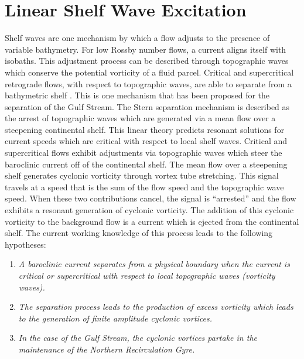 \documentclass[12pt]{workjournal}
\begin{document}
\chapter{Linear Shelf Wave Excitation} \label{chapter:shelfwaves}
Shelf waves are one mechanism by which a flow adjusts to the presence of variable bathymetry. For low Rossby number flows, a current aligns itself with isobaths. This adjustment process can be described through topographic waves which conserve the potential vorticity of a fluid parcel. Critical and supercritical retrograde flows, with respect to topographic waves, are able to separate from a bathymetric shelf \citep{Stern1998}. This is one mechanism that has been proposed for the separation of the Gulf Stream. The Stern separation mechanism is described as the arrest of topographic waves which are generated via a mean flow over a steepening continental shelf. This linear theory predicts resonant solutions for current speeds which are critical with respect to local shelf waves. Critical and supercritical flows exhibit adjustments via topographic waves which steer the baroclinic current off of the continental shelf. The mean flow over a steepening shelf generates cyclonic vorticity through vortex tube stretching. This signal travels at a speed that is the sum of the flow speed and the topographic wave speed. When these two contributions cancel, the signal is ``arrested'' and the flow exhibits a resonant generation of cyclonic vorticity. The addition of this cyclonic vorticity to the background flow is a current which is ejected from the continental shelf. The current working knowledge of this process leads to the following hypotheses:\\
\begin{center}
\begin{enumerate}
\item \textit{ A baroclinic current separates from a physical boundary when the current is critical or supercritical with respect to local topographic waves (vorticity waves).}
\item \textit{ The separation process leads to the production of excess vorticity which leads to the generation of finite amplitude cyclonic vortices.}
\item \textit{ In the case of the Gulf Stream, the cyclonic vortices partake in the maintenance of the Northern Recirculation Gyre.}
\end{enumerate}
\end{center} 
\end{document}
